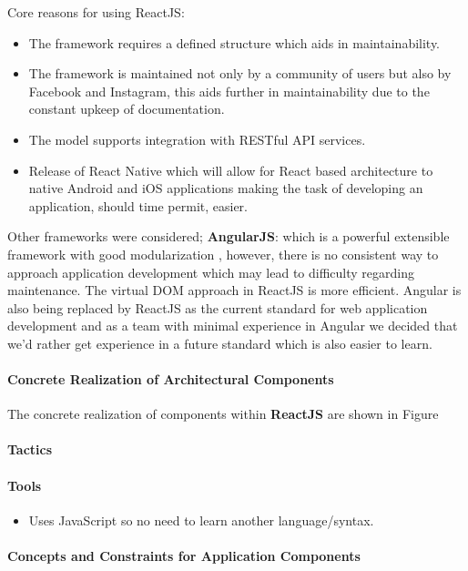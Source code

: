 Core reasons for using ReactJS:
\begin{itemize}
	\item The framework requires a defined structure which aids in maintainability.
	\item The framework is maintained not only by a community of users but also
	by Facebook and Instagram, this aids further in maintainability due to the 
	constant upkeep of documentation.
	\item The model supports integration with RESTful API services.
	\item Release of React Native which will allow for React based architecture 
	to native Android and iOS applications making the task of developing an 
	application, should time permit, easier.
\end{itemize}
Other frameworks were considered;
\textbf{AngularJS}: which is a powerful extensible framework with good modularization
, however, there is no consistent way to approach application development which may 
lead to difficulty regarding maintenance. The virtual DOM approach in ReactJS is more
efficient. Angular is also being replaced by ReactJS as the current standard for web 
application development and as a team with minimal experience in Angular we decided 
that we'd rather get experience in a future standard which is also easier to learn.

\paragraph{Concrete Realization of Architectural Components}
The concrete realization of components within \textbf{ReactJS} are shown in Figure
\paragraph{Tactics}
\paragraph{Tools}
\begin{itemize}
	\item Uses JavaScript so no need to learn another language/syntax.
\end{itemize}
\paragraph{Concepts and Constraints for Application Components}